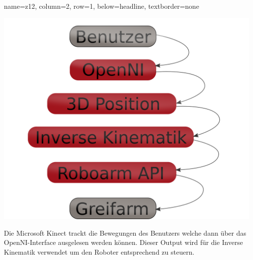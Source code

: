\documentclass[portrait,a0paper]{baposter}
\begin{document}
\begin{poster}
    {
    name=z12,
    column=2,
    row=1,
    below=headline,
    textborder=none
    }
    {

\includegraphics[width=\textwidth]{imgs/komponenten.png}

Die Microsoft Kinect trackt die Bewegungen des Benutzers welche dann über das OpenNI-Interface ausgelesen werden können. Dieser Output wird für die Inverse Kinematik verwendet um den Roboter entsprechend zu steuern.
 }
 
%



\end{poster}
\end{document}
